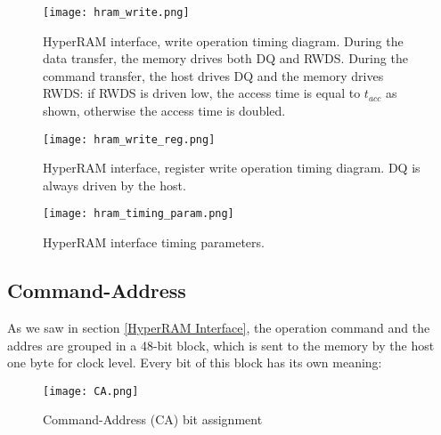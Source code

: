 \documentclass[10pt, english, a4paper, titlepage, oneside]{book}
\begin{document}
\vspace{6mm}
\begin{figure}[H]
    \centering
    \captionsetup{width=17cm}
    \texttt{[image: hram\_write.png]}
    \vspace{2mm}
    \caption{\centering HyperRAM interface, write operation timing diagram. During the data transfer, the memory drives both DQ and RWDS. During the command transfer, the host drives DQ and the memory drives RWDS: if RWDS is driven low, the access time is equal to $t_{acc}$ as shown, otherwise the access time is doubled.}
    \label{hram_write}
\end{figure}
\vspace{6mm}
\begin{figure}[H]
    \centering
    \captionsetup{width=16.5cm}
    \texttt{[image: hram\_write\_reg.png]}
    \vspace{2mm}
    \caption{\centering HyperRAM interface, register write operation timing diagram. DQ is always driven by the host.}
    \label{hram_write_reg}
\end{figure}
\begin{figure}[H]
    \centering
    \captionsetup{width=16.5cm}
    \texttt{[image: hram\_timing\_param.png]}
    \vspace{2mm}
    \caption{\centering HyperRAM interface timing parameters.}
    \label{hram_timing_param}
\end{figure}
\vspace{4mm}
\subsection{Command-Address }
\vspace{2mm}
As we saw in section \ref{HyperRAM Interface}, the operation command and the addres are grouped in a 48-bit block, which is sent to the memory by the host one byte for clock level. Every bit of this block has its own meaning:
\vspace{4mm}
\begin{figure}[H]
    \centering
    \texttt{[image: CA.png]}
    \vspace{3mm}
    \caption{Command-Address (CA) bit assignment}
    \label{CA}
\end{figure}
\vspace{1mm}
\end{document}
